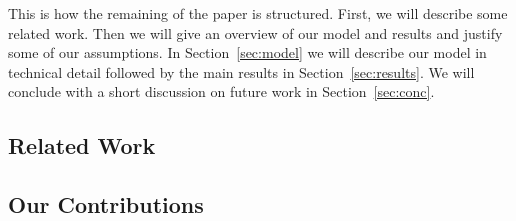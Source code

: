 This is how the remaining of the paper is structured. First, we will describe some related work. Then we will give an overview of our model and results and justify some of our assumptions. 
In Section~\ref{sec:model} we will describe our model in technical detail followed by the main results in Section~\ref{sec:results}. 
We will conclude with a short discussion on future work in Section~\ref{sec:conc}.

\subsection{Related Work}


\subsection{Our Contributions}


